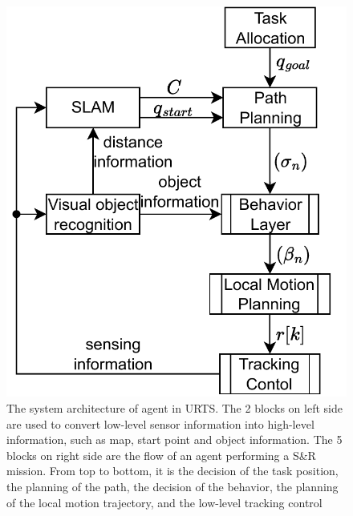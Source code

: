 \documentclass{ieeeaccess}
\begin{document}
\begin{figure}[htbp]
\centering
\includegraphics[scale=.5]{fig/sys.pdf}\caption{The system architecture of agent in URTS. The 2 blocks on left side are used to convert low-level sensor information into high-level information, such as map, start point and object information. The 5 blocks on right side are the flow of an agent performing a S\&R mission. From top to bottom, it is the decision of the task position, the planning of the path, the decision of the behavior, the planning of the local motion trajectory, and the low-level tracking control}%
\label{fig:sys}
\end{figure}
\end{document}
